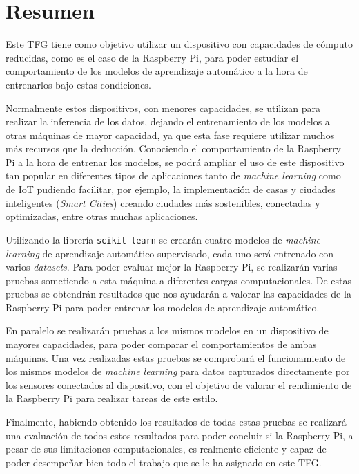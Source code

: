 \documentclass[a4paper, 12pt]{book}
\begin{document}

\chapter*{Resumen}

Este TFG tiene como objetivo utilizar un dispositivo con capacidades de cómputo reducidas, como es el caso de la Raspberry Pi, para poder estudiar el comportamiento de los modelos de aprendizaje automático a la hora de entrenarlos bajo estas condiciones. 

Normalmente estos dispositivos, con menores capacidades, se utilizan para realizar la inferencia de los datos, dejando el entrenamiento de los modelos a otras máquinas de mayor capacidad, ya que esta fase requiere utilizar muchos más recursos que la deducción. Conociendo el comportamiento de la Raspberry Pi a la hora de entrenar los modelos, se podrá ampliar el uso de este dispositivo tan popular en diferentes tipos de aplicaciones tanto de \textit{machine learning} como de IoT pudiendo facilitar, por ejemplo, la implementación de casas y ciudades inteligentes (\textit{Smart Cities}) creando ciudades más sostenibles, conectadas y optimizadas, entre otras muchas aplicaciones.

Utilizando la librería \texttt{scikit-learn} se crearán cuatro modelos de \textit{machine learning} de aprendizaje automático supervisado, cada uno será entrenado con varios \textit{datasets}. Para poder evaluar mejor la Raspberry Pi, se realizarán varias pruebas sometiendo a esta máquina a diferentes cargas computacionales. De estas pruebas se obtendrán resultados que nos ayudarán a valorar las capacidades de la Raspberry Pi para poder entrenar los modelos de aprendizaje automático.

En paralelo se realizarán pruebas a los mismos modelos en un dispositivo de mayores capacidades, para poder comparar el comportamientos de ambas máquinas. Una vez realizadas estas pruebas se comprobará el funcionamiento de los mismos modelos de \textit{machine learning} para datos capturados directamente por los sensores conectados al dispositivo, con el objetivo de valorar el rendimiento de la Raspberry Pi para realizar tareas de este estilo.

Finalmente, habiendo obtenido los resultados de todas estas pruebas se realizará una evaluación de todos estos resultados para poder concluir si la Raspberry Pi, a pesar de sus limitaciones computacionales, es realmente eficiente y capaz de poder desempeñar bien todo el trabajo que se le ha asignado en este TFG.
\end{document}
